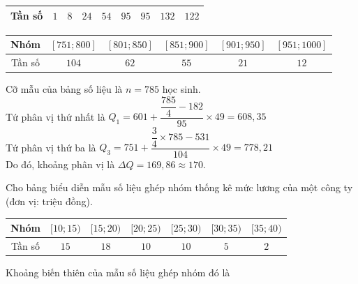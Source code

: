 \begin{ex}
{\begin{center}
\begin{tabular}{|c|c|c|c|c|c|c|c|c|}
		\hline Tần số & $1$ & $8$ & $24$ & $54$ &$95$& $95$ & $132$ & $122$ \\
		\hline
	\end{tabular}
\end{center}
	\begin{center}
	\begin{tabular}{|c|c|c|c|c|c|}
		\hline Nhóm  &	$[751 ; 800]$ &	$[801 ; 850]$& $[851 ; 900]$ & $[901 ; 950]$ &	$[951 ; 1000]$ \\
		\hline Tần số & $104$ &$62$& $55$ & $21$ & $12$ \\
		\hline
	\end{tabular}
\end{center}
Cỡ mẫu của bảng số liệu là $n=785$ học sinh.\\
Tứ phân vị thứ nhất là $Q_1=601+\dfrac{\dfrac{785}{4}-182}{95}\times 49=608{,}35$\\
Tứ phân vị thứ ba là $Q_3=751+\dfrac{\dfrac{3}{4}\times 785-531}{104}\times 49=778{,}21$\\
Do đó, khoảng phân vị là $\Delta Q=169{,}86\approx 170$.

}
\end{ex}

\begin{ex}%
Cho bảng biểu diễn mẫu số liệu ghép nhóm thống kê mức lương của một công ty (đơn vị: triệu đồng).
\begin{center}\begin{tabular}{|c|c|c|c|c|c|c|}
			\hline Nhóm & $[10 ; 15)$ & $[15 ; 20)$ & $[20 ; 25)$ & $[25 ; 30)$ & $[30 ; 35)$ & $[35 ; 40)$  \\
			\hline Tần số & $15$ & $18$ & $10$ &$10$ &$5$ &$2$\\
			\hline
\end{tabular}\end{center}
Khoảng biến thiên của mẫu số liệu ghép nhóm đó là
\end{ex}

